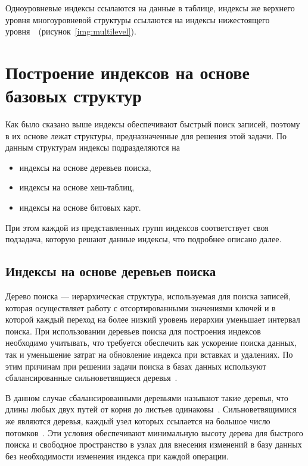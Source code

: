 Одноуровневые индексы ссылаются на данные в таблице, индексы же верхнего уровня
многоуровневой структуры ссылаются на индексы нижестоящего
уровня~\cite{ship}~(рисунок~\ref{img:multilevel}).


\section{Построение индексов на основе базовых структур\label{methods}}

Как было сказано выше индексы обеспечивают быстрый поиск записей, поэтому в их
основе лежат структуры, предназначенные для решения этой задачи. По данным
структурам индексы подразделяются на
\begin{itemize}
    \item индексы на основе деревьев поиска,
    \item индексы на основе хеш-таблиц,
    \item индексы на основе битовых карт.
\end{itemize}

При этом каждой из представленных групп индексов соответствует своя подзадача,
которую решают данные индексы, что подробнее описано далее.

\subsection{Индексы на основе деревьев поиска}

Дерево поиска --- иерархическая структура, используемая для поиска
записей, которая осуществляет работу с отсортированными значениями ключей и в
которой каждый переход на более низкий уровень иерархии уменьшает интервал
поиска. При использовании деревьев поиска для построения индексов необходимо
учитывать, что требуется обеспечить как ускорение поиска данных, так и
уменьшение затрат на обновление индекса при вставках и удалениях. По этим
причинам при решении задачи поиска в базах данных используют сбалансированные
сильноветвящиеся деревья~\cite{arki}.

В данном случае сбалансированными деревьями называют такие деревья, что
длины любых двух путей от корня до листьев одинаковы~\cite{encycl}.
Сильноветвящимися же являются деревья, каждый узел которых ссылается на
большое число потомков~\cite{squares}.  Эти условия обеспечивают минимальную
высоту дерева для быстрого поиска и свободное пространство в узлах для внесения
изменений в базу данных без необходимости изменения индекса при каждой операции.

